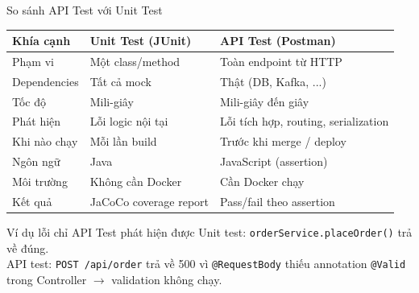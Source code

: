 \documentclass[aspectratio=169,10pt]{beamer}
\begin{document}
\begin{frame}[shrink=8]{So sánh API Test với Unit Test}
  \begin{center}
  \small
  \begin{tabular}{p{2.5cm}p{4.1cm}p{3.9cm}}
    \toprule
    \textbf{Khía cạnh} & \textbf{Unit Test (JUnit)} & \textbf{API Test (Postman)} \\
    \midrule
    Phạm vi       & Một class/method               & Toàn endpoint từ HTTP \\
    Dependencies  & Tất cả mock                    & Thật (DB, Kafka, ...) \\
    Tốc độ        & Mili-giây                      & Mili-giây đến giây \\
    Phát hiện     & Lỗi logic nội tại              & Lỗi tích hợp, routing, serialization \\
    Khi nào chạy  & Mỗi lần build                  & Trước khi merge / deploy \\
    Ngôn ngữ      & Java                           & JavaScript (assertion) \\
    Môi trường    & Không cần Docker               & Cần Docker chạy \\
    Kết quả       & JaCoCo coverage report         & Pass/fail theo assertion \\
    \bottomrule
  \end{tabular}
  \end{center}

  \vspace{0.3em}
  \begin{exampleblock}{Ví dụ lỗi chỉ API Test phát hiện được}
    Unit test: \texttt{orderService.placeOrder()} trả về đúng. \\
    API test: \texttt{POST /api/order} trả về 500 vì \texttt{@RequestBody}
    thiếu annotation \texttt{@Valid} trong Controller $\to$ validation không chạy.
  \end{exampleblock}
\end{frame}
\end{document}
